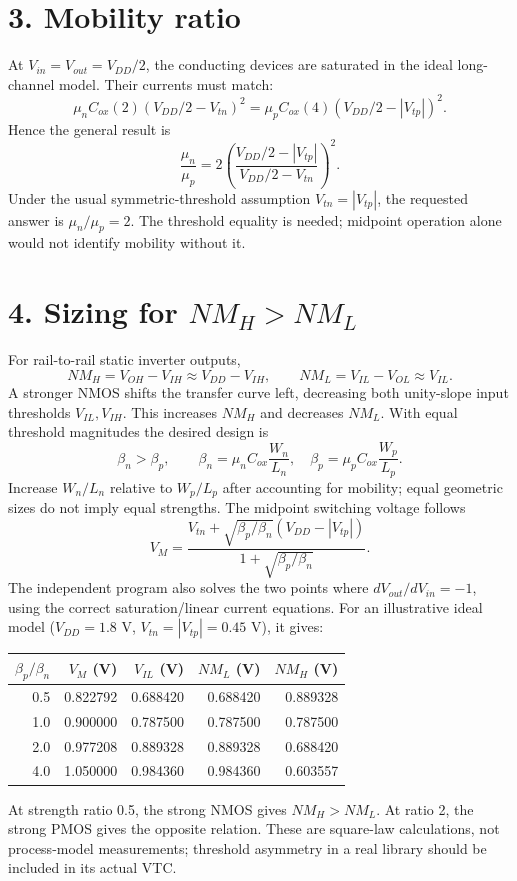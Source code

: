\documentclass[11pt]{article}
\begin{document}
\section*{3. Mobility ratio}
At $V_{in}=V_{out}=V_{DD}/2$, the conducting devices are saturated in the ideal long-channel model. Their currents must match:
\[
\mu_n C_{ox}(2)(V_{DD}/2-V_{tn})^2=\mu_p C_{ox}(4)(V_{DD}/2-|V_{tp}|)^2.
\]
Hence the general result is
\[
\frac{\mu_n}{\mu_p}=2\left(\frac{V_{DD}/2-|V_{tp}|}{V_{DD}/2-V_{tn}}\right)^2.
\]
Under the usual symmetric-threshold assumption $V_{tn}=|V_{tp}|$, the requested answer is $\boxed{\mu_n/\mu_p=2}$. The threshold equality is needed; midpoint operation alone would not identify mobility without it.

\newpage\section*{4. Sizing for $NM_H>NM_L$}
For rail-to-rail static inverter outputs,
\[
NM_H=V_{OH}-V_{IH}\approx V_{DD}-V_{IH},\qquad NM_L=V_{IL}-V_{OL}\approx V_{IL}.
\]
A stronger NMOS shifts the transfer curve left, decreasing both unity-slope input thresholds $V_{IL},V_{IH}$. This increases $NM_H$ and decreases $NM_L$. With equal threshold magnitudes the desired design is
\[
\boxed{\beta_n>\beta_p,\qquad\beta_n=\mu_n C_{ox}\frac{W_n}{L_n},\quad\beta_p=\mu_p C_{ox}\frac{W_p}{L_p}.}
\]
Increase $W_n/L_n$ relative to $W_p/L_p$ after accounting for mobility; equal geometric sizes do not imply equal strengths. The midpoint switching voltage follows
\[
V_M=\frac{V_{tn}+\sqrt{\beta_p/\beta_n}(V_{DD}-|V_{tp}|)}{1+\sqrt{\beta_p/\beta_n}}.
\]
The independent program also solves the two points where $dV_{out}/dV_{in}=-1$, using the correct saturation/linear current equations. For an illustrative ideal model ($V_{DD}=1.8$ V, $V_{tn}=|V_{tp}|=0.45$ V), it gives:
\begin{center}\begin{tabular}{rrrrr}\toprule $\beta_p/\beta_n$&$V_M$ (V)&$V_{IL}$ (V)&$NM_L$ (V)&$NM_H$ (V)\\\midrule
0.5&0.822792&0.688420&0.688420&0.889328\\
1.0&0.900000&0.787500&0.787500&0.787500\\
2.0&0.977208&0.889328&0.889328&0.688420\\
4.0&1.050000&0.984360&0.984360&0.603557\\
\bottomrule\end{tabular}\end{center}
At strength ratio 0.5, the strong NMOS gives $NM_H>NM_L$. At ratio 2, the strong PMOS gives the opposite relation. These are square-law calculations, not process-model measurements; threshold asymmetry in a real library should be included in its actual VTC.
\end{document}
